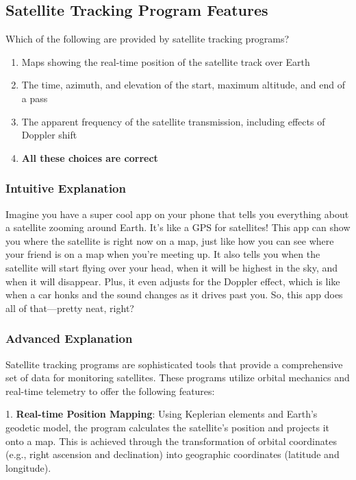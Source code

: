 \subsection{Satellite Tracking Program Features}
\label{T8B03}

\begin{tcolorbox}[colback=gray!10!white,colframe=black!75!black,title=T8B03]
Which of the following are provided by satellite tracking programs?
\begin{enumerate}[label=\Alph*)]
    \item Maps showing the real-time position of the satellite track over Earth
    \item The time, azimuth, and elevation of the start, maximum altitude, and end of a pass
    \item The apparent frequency of the satellite transmission, including effects of Doppler shift
    \item \textbf{All these choices are correct}
\end{enumerate}
\end{tcolorbox}

\subsubsection{Intuitive Explanation}
Imagine you have a super cool app on your phone that tells you everything about a satellite zooming around Earth. It’s like a GPS for satellites! This app can show you where the satellite is right now on a map, just like how you can see where your friend is on a map when you’re meeting up. It also tells you when the satellite will start flying over your head, when it will be highest in the sky, and when it will disappear. Plus, it even adjusts for the Doppler effect, which is like when a car honks and the sound changes as it drives past you. So, this app does all of that—pretty neat, right?

\subsubsection{Advanced Explanation}
Satellite tracking programs are sophisticated tools that provide a comprehensive set of data for monitoring satellites. These programs utilize orbital mechanics and real-time telemetry to offer the following features:

1. \textbf{Real-time Position Mapping}: Using Keplerian elements and Earth's geodetic model, the program calculates the satellite's position and projects it onto a map. This is achieved through the transformation of orbital coordinates (e.g., right ascension and declination) into geographic coordinates (latitude and longitude).

